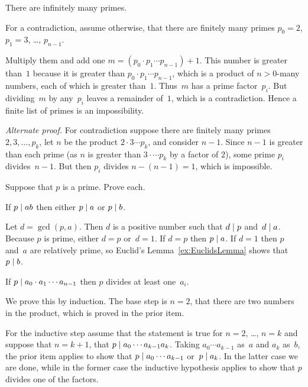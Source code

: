 \documentclass{ibl}  %
\begin{document}
\begin{problem} 
There are infinitely many primes.  
\begin{answer}
For a contradiction, assume otherwise,
that there are finitely many primes 
$p_0=2$, $p_1=3$, \ldots, $p_{n-1}$.

Multiply them and add one $m=(p_0\cdot p_1\cdots p_{n-1})+1$.
This number is greater than~$1$ because it is greater than 
$p_0\cdot p_1\cdots p_{n-1}$, 
which is a product of $n>0$-many numbers, each of which is greater than~$1$.
Thus~$m$ has a prime factor~$p_i$.
But dividing~$m$ by any~$p_i$ 
leaves a remainder of~$1$, which
is a contradiction. 
Hence a finite
list of primes is an impossibility.

\textit{Alternate proof.}
For contradiction suppose there are finitely many primes
$2,3,\ldots,p_k$, let $n$ be the product $2\cdot 3\cdots p_k$,
and consider $n-1$.
Since $n-1$ is greater than each prime (as $n$ is greater than
$3\cdot\cdots p_k$ by a factor of $2$), 
some prime $p_i$ divides~$n-1$.
But then $p_i$ divides $n-(n-1)=1$, which is impossible.
\end{answer}
\end{problem}

\begin{problem} 
Suppose that $p$ is a prime.  Prove each.\label{ex:EuclidsOtherLemma}
\begin{exes}
\begin{exercise} 
  If  $p\mid ab$ then either $p\mid a$ or $p\mid b$.
\end{exercise}
\begin{answer}
  Let $d=\gcd(p,a)$.
  Then $d$ is a positive number such that $d\mid p$ and~$d\mid a$.
  Because $p$ is prime, either $d=p$ or~$d=1$.
  If $d=p$ then $p\mid a$.
  If $d=1$ then $p$ and~$a$ are relatively prime, 
  so Euclid's Lemma~\ref{ex:EuclidsLemma} shows that 
  $p\mid b$.
\end{answer}
\begin{exercise} 
  If $p\mid a_0\cdot a_1\cdots a_{n-1}$ then $p$ divides at least one~$a_i$.
\end{exercise}
\begin{answer}
  We prove this by induction.
  The base step is $n=2$, that there are two numbers in the product, which
  is proved in the prior item.

  For the inductive step assume that the statement is true for $n=2$, \ldots,
  $n=k$ and suppose that $n=k+1$, that $p\mid a_0\cdots a_{k-1}a_k$.
  Taking $a_0\cdots a_{k-1}$ as~$a$ and $a_k$ as~$b$, the prior item applies
  to show that $p\mid a_0\cdots a_{k-1}$ or~$p\mid a_k$.
  In the latter case we are done, while in the former case the
  inductive hypothesis applies to show that $p$ divides one of the factors.  
\end{answer}
\end{exes}
\end{problem}
\end{document}
